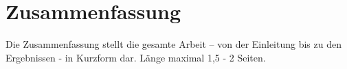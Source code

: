 \chapter{Zusammenfassung} \label{cha:summary}
Die Zusammenfassung stellt die gesamte Arbeit – von der Einleitung bis zu den Ergebnissen - 
in Kurzform dar. Länge maximal 1,5 - 2 Seiten.